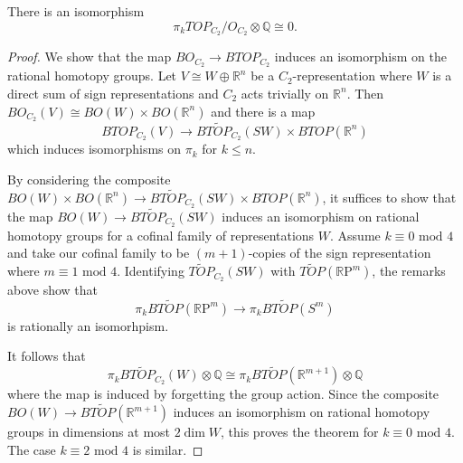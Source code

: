 \documentclass[10pt,a4paper]{amsart}
\newcommand{\Q}{\mathbb Q}
\newcommand{\RP}{\mathbb R\text{P}}
\newcommand{\R}{\mathbb R}
\begin{document}
\begin{theorem}\label{thm: main thm C_2}
There is an isomorphism
\[
\pi_k TOP_{C_2}/O_{C_2}\otimes\Q\cong 0.
\]
\end{theorem}

\begin{proof}
We show that the map $BO_{C_2}\rightarrow BTOP_{C_2}$ induces an isomorphism on the rational homotopy groups.
Let $V\cong W\oplus\R^n$ be a $C_2$-representation where $W$ is a direct sum of sign representations and $C_2$ acts trivially on $\R^n$.
Then $BO_{C_2}(V)\cong BO(W)\times BO(\R^n)$ and there is a map
\[
BTOP_{C_2}(V)\rightarrow B\widetilde{TOP}_{C_2}(SW)\times BTOP(\R^n)
\]
which induces isomorphisms on $\pi_k$ for $k\le n$.

By considering the composite $BO(W)\times BO(\R^n)\rightarrow B\widetilde{TOP}_{C_2}(SW)\times BTOP(\R^n)$, it suffices to show that the map $BO(W)\rightarrow B\widetilde{TOP}_{C_2}(SW)$ induces an isomorphism on rational homotopy groups for a cofinal family of representations $W$.
Assume $k\equiv0\text{ mod }4$ and take our cofinal family to be $(m+1)$-copies of the sign representation where $m\equiv1\text{ mod }4$.
Identifying $\widetilde{TOP}_{C_2}(SW)$ with $\widetilde{TOP}(\RP^m)$, the remarks above show that
\[
\pi_kB\widetilde{TOP}(\RP^m)\rightarrow\pi_kB\widetilde{TOP}(S^m)
\]
is rationally an isomorhpism.

It follows that
\[
\pi_kB\widetilde{TOP}_{C_2}(W)\otimes\Q\cong\pi_kB\widetilde{TOP}(\R^{m+1})\otimes\Q
\]
where the map is induced by forgetting the group action.
Since the composite $BO(W)\rightarrow B\widetilde{TOP}(\R^{m+1})$ induces an isomorphism on rational homotopy groups in dimensions at most $2\dim W$, this proves the theorem for $k\equiv0\text{ mod }4$.
The case $k\equiv2\text{ mod }4$ is similar.
\end{proof}
\end{document}
